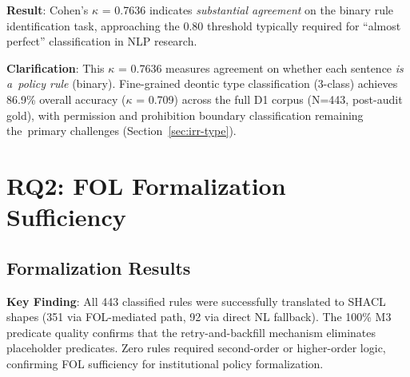\textbf{Result}: Cohen's $\kappa$ = 0.7636 indicates \textit{substantial agreement} on the binary rule identification task, approaching the 0.80 threshold typically required for ``almost perfect'' classification in NLP research.

\textbf{Clarification}: This $\kappa$ = 0.7636 measures agreement on whether each sentence \textit{is a~policy rule} (binary). Fine-grained deontic type classification (3-class) achieves 86.9\% overall accuracy ($\kappa$ = 0.709) across the full D1 corpus (N=443, post-audit gold), with permission and prohibition boundary classification remaining the~primary challenges (Section~\ref{sec:irr-type}).

\section{RQ2: FOL Formalization Sufficiency}

\subsection{Formalization Results}

\begin{table}[htbp]
\centering
\caption{FOL Formalization Performance (Full D1 Corpus)}
\label{tab:fol-results}
\end{table}

\textbf{Key Finding}: All 443 classified rules were successfully translated to SHACL shapes (351 via FOL-mediated path, 92 via direct NL fallback). The 100\% M3 predicate quality confirms that the retry-and-backfill mechanism eliminates placeholder predicates. Zero rules required second-order or higher-order logic, confirming FOL sufficiency for institutional policy formalization.

